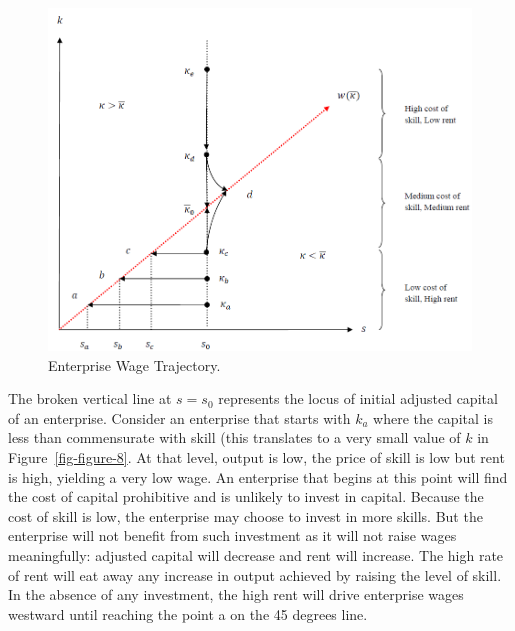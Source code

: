 \documentclass[
  a4paper,
  DIV=11,
  numbers=noendperiod]{scrartcl}
\begin{document}
\begin{figure}

{\centering \includegraphics{figures/figure-9.png}

}

\caption{\label{fig-figure-9}Enterprise Wage Trajectory.}

\end{figure}

The broken vertical line at \(s=s_0\) represents the locus of initial
adjusted capital of an enterprise. Consider an enterprise that starts
with \(k_a\) where the capital is less than commensurate with skill
(this translates to a very small value of \(k\) in
Figure~\ref{fig-figure-8}. At that level, output is low, the price of
skill is low but rent is high, yielding a very low wage. An enterprise
that begins at this point will find the cost of capital prohibitive and
is unlikely to invest in capital. Because the cost of skill is low, the
enterprise may choose to invest in more skills. But the enterprise will
not benefit from such investment as it will not raise wages
meaningfully: adjusted capital will decrease and rent will increase. The
high rate of rent will eat away any increase in output achieved by
raising the level of skill. In the absence of any investment, the high
rent will drive enterprise wages westward until reaching the point a on
the 45 degrees line.
\end{document}
